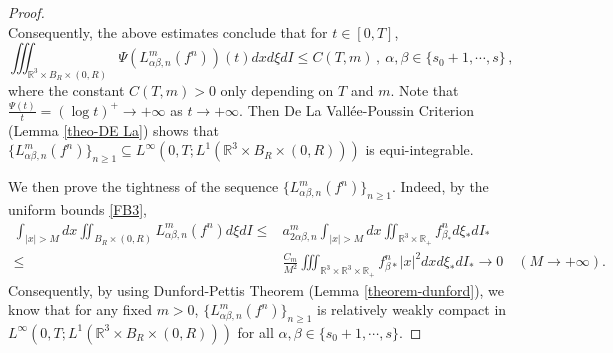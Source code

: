 \documentclass[reqno,11pt]{amsart}
\numberwithin{equation}{section}
\def\R{\mathbb{R}}
\begin{document}
\begin{proof}
\begin{equation*}
\end{equation*}
Consequently, the above estimates conclude that for $t \in [0, T]$,     
	\begin{equation}\label{Psi-Lnab}
		\iiint_{\R^3 \times B_R \times(0,R)} \Psi (L^m_{ \alpha \beta ,n}(f^n)) (t) dxd\xi dI \leq C(T,m) \,, \ \alpha, \beta \in \{ s_0 + 1, \cdots, s \} \,,
	\end{equation}
where the constant $ C(T,m) > 0 $ only depending on $T$ and $m$. Note that $\frac{\Psi (t)}{t} = (\log t)^+ \to + \infty$ as $t \to + \infty$. Then De La Vall\'ee-Poussin Criterion (Lemma \ref{theo-DE La}) shows that $\{ L^m_{ \alpha \beta ,n}(f^n) \}_{n \geq 1} \subseteq L^\infty (0,T; L^1(\R^3 \times B_R\times (0,R) ))$ is equi-integrable. 

We then prove the tightness of the sequence $ \{ L^m_{ \alpha \beta ,n}(f^n) \}_{n \geq 1} $. Indeed, by the uniform bounds \eqref{FB3},
	\begin{equation*}
		\begin{aligned}
			\int_{|x|>M}dx \iint_{B_R \times (0,R)}L^m_{ \alpha \beta ,n}(f^n)d\xi dI 
			\leq & a^m_{2\alpha \beta,n} \int_{|x|>M}dx \iint_{\R^3 \times \R_+} f^n_{\beta_*} d\xi_* dI_* \\
			\leq & \tfrac{C_m}{M^2} \iiint_{\R^3 \times \R^3 \times \R_+}  f^n_{\beta *}|x|^2dx d\xi_* dI_* \rightarrow 0 \quad (M \rightarrow +\infty).
		\end{aligned}
	\end{equation*}
Consequently, by using Dunford-Pettis Theorem (Lemma \ref{theorem-dunford}), we know that for any fixed $m>0$, $\{ L^m_{ \alpha \beta ,n} (f^n) \}_{n \geq 1} $ is relatively weakly compact in $L^\infty (0,T; L^1(\R^3 \times B_R\times (0,R) ))$ for all $\alpha, \beta \in \{ s_0 + 1, \cdots, s \}$. 


\end{proof}
\end{document}
